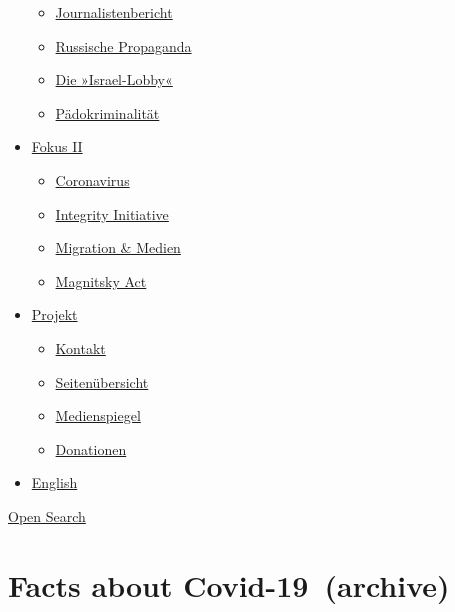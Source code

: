 \begin{itemize}
  \begin{itemize}
  \tightlist
  \item
    \href{https://swprs.org/bericht-eines-journalisten/}{Journalistenbericht}
  \item
    \href{https://swprs.org/russische-propaganda/}{Russische Propaganda}
  \item
    \href{https://swprs.org/die-israel-lobby-fakten-und-mythen/}{Die
    »Israel-Lobby«}
  \item
    \href{https://swprs.org/geopolitik-und-paedokriminalitaet/}{Pädokriminalität}
  \end{itemize}
\item
  \href{https://swprs.org/migration-und-medien/}{Fokus II}

  \begin{itemize}
  \tightlist
  \item
    \href{https://swprs.org/covid-19-hinweis-ii/}{Coronavirus}
  \item
    \href{https://swprs.org/die-integrity-initiative/}{Integrity
    Initiative}
  \item
    \href{https://swprs.org/migration-und-medien/}{Migration \& Medien}
  \item
    \href{https://swprs.org/der-fall-magnitsky/}{Magnitsky Act}
  \end{itemize}
\item
  \href{https://swprs.org/kontakt/}{Projekt}

  \begin{itemize}
  \tightlist
  \item
    \href{https://swprs.org/kontakt/}{Kontakt}
  \item
    \href{https://swprs.org/uebersicht/}{Seitenübersicht}
  \item
    \href{https://swprs.org/medienspiegel/}{Medienspiegel}
  \item
    \href{https://swprs.org/donationen/}{Donationen}
  \end{itemize}
\item
  \href{https://swprs.org/contact/}{English}
\end{itemize}

\protect\hyperlink{}{Open Search}

\hypertarget{facts-about-covid-19-archive}{%
\section{Facts about
Covid-19~(archive)}\label{facts-about-covid-19-archive}}

